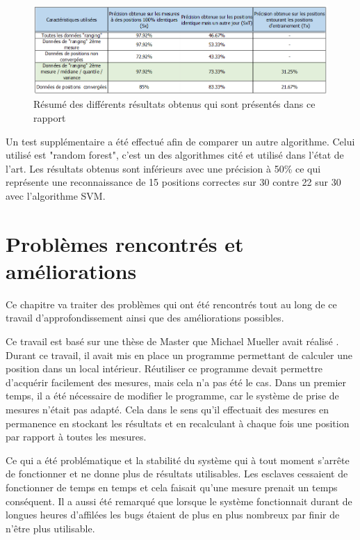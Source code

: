 \begin{figure}[htp]
 \begin{center}
  \includegraphics[scale=0.7]{figures/Resultats.png}
  \caption{Résumé des différents résultats obtenus qui sont présentés dans ce rapport}
  \label{fig:result} %
 \end{center}
\end{figure}

Un test supplémentaire a été effectué afin de comparer un autre algorithme. Celui utilisé est "random forest", c'est un des algorithmes cité et utilisé dans l'état de l'art. Les résultats obtenus sont inférieurs avec une précision à 50\% ce qui représente une reconnaissance de 15 positions correctes sur 30 contre 22 sur 30 avec l'algorithme SVM. 

\chapter{Problèmes rencontrés et améliorations}
Ce chapitre va traiter des problèmes qui ont été rencontrés tout au long de ce travail d'approfondissement ainsi que des améliorations possibles.

Ce travail est basé sur une thèse de Master que Michael Mueller avait réalisé \cite{MIC}. Durant ce travail, il avait mis en place un programme permettant de calculer une position dans un local intérieur. Réutiliser ce programme devait permettre d'acquérir facilement des mesures, mais cela n'a pas été le cas. Dans un premier temps, il a été nécessaire de modifier le programme, car le système de prise de mesures n'était pas adapté. Cela dans le sens qu'il effectuait des mesures en permanence en stockant les résultats et en recalculant à chaque fois une position par rapport à toutes les mesures. 

Ce qui a été problématique et la stabilité du système qui à tout moment s'arrête de fonctionner et ne donne plus de résultats utilisables. Les esclaves cessaient de fonctionner de temps en temps et cela faisait qu'une mesure prenait un temps conséquent. Il a aussi été remarqué que lorsque le système fonctionnait durant de longues heures d'affilées les bugs étaient de plus en plus nombreux par finir de n'être plus utilisable. 

